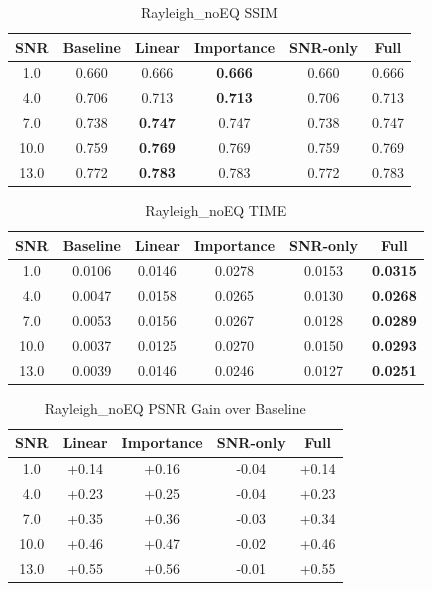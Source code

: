 \begin{table}[h]
\centering
\caption{Rayleigh_noEQ SSIM}
\begin{tabular}{c|ccccc}
\hline
SNR & Baseline & Linear & Importance & SNR-only & Full \\ \hline
1.0 & 0.660 & 0.666 & \textbf{0.666} & 0.660 & 0.666 \\
4.0 & 0.706 & 0.713 & \textbf{0.713} & 0.706 & 0.713 \\
7.0 & 0.738 & \textbf{0.747} & 0.747 & 0.738 & 0.747 \\
10.0 & 0.759 & \textbf{0.769} & 0.769 & 0.759 & 0.769 \\
13.0 & 0.772 & \textbf{0.783} & 0.783 & 0.772 & 0.783 \\
\hline
\end{tabular}
\end{table}

\begin{table}[h]
\centering
\caption{Rayleigh_noEQ TIME}
\begin{tabular}{c|ccccc}
\hline
SNR & Baseline & Linear & Importance & SNR-only & Full \\ \hline
1.0 & 0.0106 & 0.0146 & 0.0278 & 0.0153 & \textbf{0.0315} \\
4.0 & 0.0047 & 0.0158 & 0.0265 & 0.0130 & \textbf{0.0268} \\
7.0 & 0.0053 & 0.0156 & 0.0267 & 0.0128 & \textbf{0.0289} \\
10.0 & 0.0037 & 0.0125 & 0.0270 & 0.0150 & \textbf{0.0293} \\
13.0 & 0.0039 & 0.0146 & 0.0246 & 0.0127 & \textbf{0.0251} \\
\hline
\end{tabular}
\end{table}

\begin{table}[h]
\centering
\caption{Rayleigh_noEQ PSNR Gain over Baseline}
\begin{tabular}{c|cccc}
\hline
SNR & Linear & Importance & SNR-only & Full \\ \hline
1.0 & +0.14 & +0.16 & -0.04 & +0.14 \\
4.0 & +0.23 & +0.25 & -0.04 & +0.23 \\
7.0 & +0.35 & +0.36 & -0.03 & +0.34 \\
10.0 & +0.46 & +0.47 & -0.02 & +0.46 \\
13.0 & +0.55 & +0.56 & -0.01 & +0.55 \\
\hline
\end{tabular}
\end{table}
